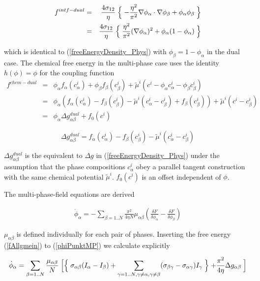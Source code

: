 \begin{eqnarray}
  \label{fGB2}
\nonumber  f^{intf-dual} &=& \frac{4\sigma_{12}}{\eta} \Bigm\{ -\frac{\eta^2}{\pi^2} \nabla\phi_\alpha \cdot \nabla\phi_\beta  + \phi_\alpha \phi_\beta \Bigm\} \\ &=& \frac{4\sigma_{12}}{\eta} \Bigm\{ \frac{\eta^2}{\pi^2} (\nabla\phi_\alpha)^2   + \phi_\alpha(1- \phi_\alpha) \Bigm\}
\end{eqnarray}

which is identical to (\ref{freeEnergyDensity_Phys}) with $\phi_\beta = 1- \phi_\alpha$ in the dual case. The chemical free energy in the multi-phase case uses the identity $h(\phi) = \phi$ for the coupling function
\begin{eqnarray}
  \label{fCH2}
\nonumber  f^{chem-dual} &=& \phi_\alpha f_\alpha(c^i_\alpha) + \phi_\beta f_\beta(c^i_\beta) + \tilde\mu^i ( c^i - \phi_\alpha c_\alpha^i - \phi_\beta c_\beta^i) \\
 \nonumber &=& \phi_\alpha (f_\alpha(c^i_\alpha) - f_\beta(c^i_\beta) - \tilde\mu^i (c_\alpha^i - c_\beta^i) + f_\beta(c^i_\beta)) + \tilde\mu^i ( c^i - c_\beta^i) \\
 &=&  \phi_\alpha \Delta g^{dual}_{\alpha\beta} + f_0(c^i)
\end{eqnarray}

\begin{equation} \label{dg_dual}
 \Delta g^{dual}_{\alpha\beta} = f_\alpha(c^i_\alpha) - f_\beta(c^i_\beta) - \tilde\mu^i (c_\alpha^i - c_\beta^i)
\end{equation}

$\Delta g^{dual}_{\alpha\beta}$ is the equivalent to $\Delta g$ in (\ref{freeEnergyDensity_Phys}) under the assumption that the phase compositions $c_\alpha^i$ obey a parallel tangent construction with the same chemical potential $\tilde\mu^i$. $f_0(c^i)$ is an offset independent of $\phi$.

The multi-phase-field equations are derived

\begin{eqnarray}
  \label{phiPunktMP}
  \dot{\phi}_\alpha = - \sum_{\beta=1..N} \frac{\pi^2}{4\eta N} \mu_{\alpha \beta}
(\frac{\delta F}{\delta\phi_\alpha}-\frac{\delta F}{\delta\phi_\beta})
\end{eqnarray}

$\mu_{\alpha\beta}$ is defined individually for each pair of phases. Inserting the free energy (\ref{fAllgmein}) to (\ref{phiPunktMP}) we calculate explicitly

\begin{equation}
  \label{phiPunktMP2}
\dot{\phi}_\alpha = \sum_{\beta=1..N} \frac{\mu_{\alpha \beta}}
 N \Bigm[\Bigm\{ \sigma_{\alpha\beta}(I_\alpha - I_\beta) + \sum_{\gamma=1..N, \gamma \ne \alpha, \gamma \ne \beta} (  \sigma_{\beta\gamma}-\sigma_{\alpha\gamma} ) I_{\gamma}\Bigm\} + \frac{\pi^2}{4\eta} \Delta g_{\alpha\beta}\Bigm]
\end{equation}

